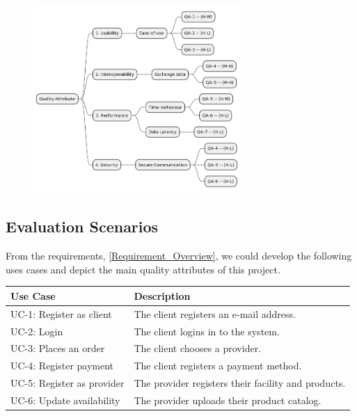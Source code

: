 \begin{figure}[H]
    \centering
    \includegraphics[width=0.7\textwidth]{assets/quality_tree.png}
    \label{fig:quality_tree}
\end{figure}


\subsection{Evaluation Scenarios} 
From the requirements, \ref{Requirement_Overview}, we could develop the following uses cases and depict the main quality 
attributes of this project. 

\begin{table}[H]
    \begin{tabularx}{\textwidth}{lX}
    \toprule
    Use Case & Description  \\
    \midrule
    UC-1: Register as \gls{client} & The \gls{client} registers an e-mail address.\\
    UC-2: Login & The \gls{client} logins in to the system. \\
    UC-3: Places an order & The \gls{client} chooses a \gls{provider}. \\
    UC-4: Register payment & The \gls{client} registers a payment method. \\
    UC-5: Register as \gls{provider} & The \gls{provider} registers their facility and products. \\
    UC-6: Update availability & The \gls{provider} uploads their product catalog. \\
    \bottomrule
    \end{tabularx}
\end{table}

